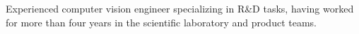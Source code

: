 
Experienced computer vision engineer specializing in R\&D tasks, having worked for more than four years in the scientific laboratory and product teams.


